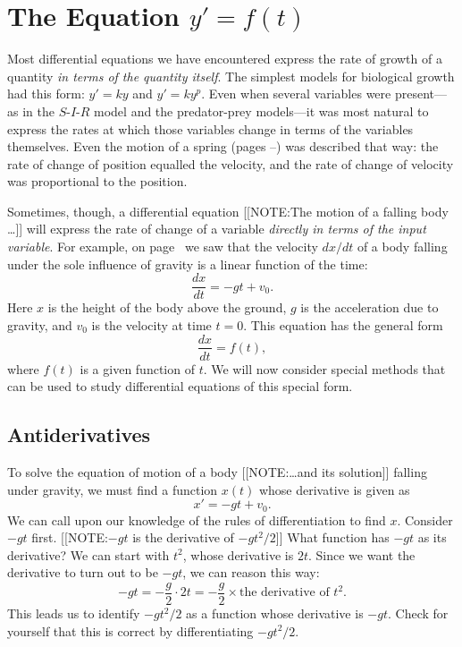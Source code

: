 \section{The Equation $y' = f(t)$}
\label{sec:the-equation-y-ft}

Most differential equations we have encountered express the rate of
growth of a quantity {\em in terms of the quantity itself}.  The
simplest models for biological growth had this form: $y' = ky$ and $y'
= ky^p$.  Even when several variables were present---as in the
$S$-$I$-$R$ model and the predator-prey models---it was most natural
to express the rates at which those variables change in terms of the
variables themselves.  Even the motion of a spring (pages
\pageref{spring-begin}--\pageref{spring-end}) was described that way:
the rate of change of position equalled the velocity, and the rate of
change of velocity was proportional to the position.

Sometimes, though, a differential equation 
[[NOTE:The motion of  a falling body \ldots]] will express the rate of
change of a variable {\em directly in terms of the input variable}.
For example, on page~\pageref{falling body0} we saw that the velocity
$dx/dt$ of a body falling under the sole influence of gravity is a
linear function of the time:
        \[
\dfrac{dx}{dt} = -gt + v_0.
\]
Here $x$ is the height of the body above the ground, $g$ is the acceleration due to gravity, and $v_0$ is the velocity at time $t = 0$.  This equation has the general form
        \[
\dfrac{dx}{dt} = f(t),
\]
where $f(t)$ is a given function of $t$.  We will now consider special methods that can be used to study differential equations of this special form.  

\subsection{Antiderivatives}
\label{subsec:antiderivatives}

        To solve the equation of motion of a body 
        [[NOTE:\ldots and its solution]]
falling under gravity, we must find a function $x(t)$ whose derivative is given as
        \[
x' = -gt + v_0.
\]
We can call upon our knowledge of the rules of differentiation to find $x$.  Consider $-gt$ first.  
        [[NOTE:$-gt$ is the derivative  of $-gt^2/2$]]
What function has $-gt$ as its derivative?  We can start with $t^2$, whose derivative is $2t$.  Since we want the derivative to turn out to be $-gt$, we can reason this way:
        \[
-gt = -\dfrac{g}{2} \cdot 2t = -\dfrac{g}{2} \times 
                \mbox{the derivative of $t^2$}.
\]
This leads us to identify $-gt^2/2$ as a function whose derivative is $-gt$.  Check for yourself that this is correct by differentiating $-gt^2/2$.

